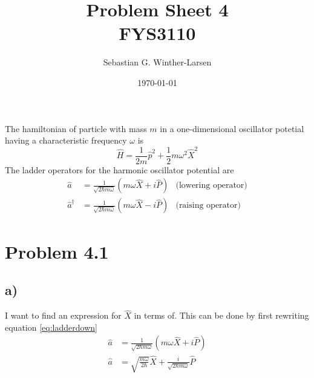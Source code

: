 \documentclass{article}
\title{Problem Sheet 4 \\
\large{FYS3110}}
\author{Sebastian G. Winther-Larsen}
\date{\today}
\begin{document}
\maketitle

The hamiltonian of particle with mass $m$ in a one-dimensional oscillator potetial having a characteristic frequency $\omega$ is
\begin{equation}
\hat{H}=\frac{1}{2m}\hat{p}^2+\frac{1}{2}m\omega^2\hat{X}^2
\end{equation}
The ladder operators for the harmonic oscillator potential are
\begin{align}
\hat{a}&=\frac{1}{\sqrt{2\hbar m\omega}}(m\omega\hat{X}+i\hat{P})
&\text{(lowering operator)} \label{eq:ladderdown} \\
\hat{a}^{\dagger}&=\frac{1}{\sqrt{2\hbar m\omega}}(m\omega\hat{X}-i\hat{P})
&\text{(raising operator)} \label{eq:ladderup}
\end{align}

\section*{Problem 4.1}

\subsection*{a)}

I want to find an expression for $\hat{X}$ in terms of. This can be done by first rewriting equation \ref{eq:ladderdown}
\begin{align*}
\hat{a}&=\frac{1}{\sqrt{2\hbar m\omega}}(m\omega\hat{X}+i\hat{P}) \\
\hat{a}&= \sqrt{\frac{m\omega}{2\hbar}}\hat{X}+\frac{i}{\sqrt{2\hbar m \omega}}\hat{P}
\end{align*}
\end{document}
